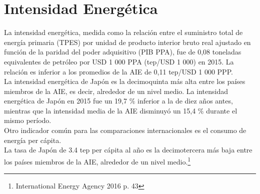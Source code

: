 \documentclass[]{article}
\begin{document}
\section{Intensidad Energética}

La intensidad energética, medida como la relación entre el suministro total de energía primaria (TPES) por unidad de producto interior bruto real ajustado en función de la paridad del poder adquisitivo (PIB PPA), fue de 0,08 toneladas equivalentes de petróleo por USD 1 000 PPA (tep/USD 1 000) en 2015. La relación es inferior a los promedios de la AIE de 0,11 tep/USD 1 000 PPP.\\

 La intensidad energética de Japón es la decimoquinta más alta entre los países miembros de la AIE, es decir, alrededor de un nivel medio. La intensidad energética de Japón en 2015 fue un 19,7 $\%$ inferior a la de diez años antes, mientras que la intensidad media de la AIE disminuyó un 15,4 $\%$ durante el mismo período.\\ 
Otro indicador común para las comparaciones internacionales es el consumo de energía per cápita.\\
La tasa de Japón de 3.4 tep per cápita al año es la decimotercera más baja entre los países miembros de la AIE, alrededor de un nivel medio.\citep{InternationalEnergyAgency2016}\footnote{International Energy Agency 2016 p. 43}\\





\end{document}
